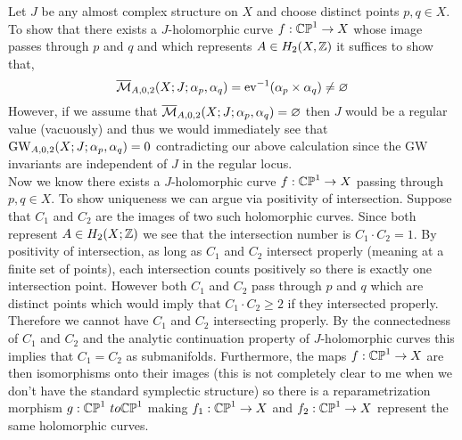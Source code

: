 \documentclass[12pt]{article}
\begin{document}
Let $J$ be any almost complex structure on $X$ and choose distinct points $p, q \in X$. To show that there exists a $J$-holomorphic curve $f : \mathbb{CP}^1 \to X$ whose image passes through $p$ and $q$ and which represents $A \in H_2(X, \mathbb{Z})$ it suffices to show that,
\[ \overline{\mathcal{M}}_{A,0,2}(X; J; \alpha_p, \alpha_q) = \mathrm{ev}^{-1}(\alpha_p \times \alpha_q) \neq \varnothing \]
However, if we assume that $\overline{\mathcal{M}}_{A,0,2}(X; J; \alpha_p, \alpha_q) = \varnothing$ then $J$ would be a regular value (vacuously) and thus we would immediately see that $\mathrm{GW}_{A,0,2}(X; J; \alpha_p, \alpha_q) = 0$ contradicting our above calculation since the GW invariants are independent of $J$ in the regular locus. 
\bigskip\\
Now we know there exists a $J$-holomorphic curve $f : \mathbb{CP}^1 \to X$ passing through $p,q \in X$. To show uniqueness we can argue via positivity of intersection. Suppose that $C_1$ and $C_2$ are the images of two such holomorphic curves. Since both represent $A \in H_2(X; \mathbb{Z})$ we see that the intersection number is $C_1 \cdot C_2 = 1$. By positivity of intersection, as long as $C_1$ and $C_2$ intersect properly (meaning at a finite set of points), each intersection counts positively so there is exactly one intersection point. However both $C_1$ and $C_2$ pass through $p$ and $q$ which are distinct points which would imply that $C_1 \cdot C_2 \ge 2$ if they intersected properly. Therefore we cannot have $C_1$ and $C_2$ intersecting properly. By the connectedness of $C_1$ and $C_2$ and the analytic continuation property of $J$-holomorphic curves this implies that $C_1 = C_2$ as submanifolds. Furthermore, the maps $f : \mathbb{CP}^1 \to X$ are then isomorphisms onto their images (this is not completely clear to me when we don't have the standard symplectic structure) so there is a reparametrization morphism $g : \mathbb{CP}^1\ to \mathbb{CP}^1$ making $f_1 : \mathbb{CP}^1 \to X$ and $f_2 : \mathbb{CP}^1 \to X$ represent the same holomorphic curves.
\end{document}
